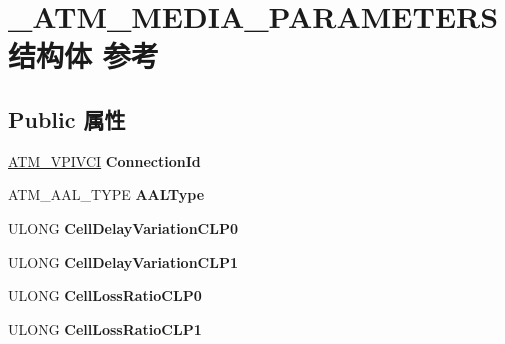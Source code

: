 \hypertarget{struct___a_t_m___m_e_d_i_a___p_a_r_a_m_e_t_e_r_s}{}\section{\+\_\+\+A\+T\+M\+\_\+\+M\+E\+D\+I\+A\+\_\+\+P\+A\+R\+A\+M\+E\+T\+E\+R\+S结构体 参考}
\label{struct___a_t_m___m_e_d_i_a___p_a_r_a_m_e_t_e_r_s}
\subsection*{Public 属性}
\begin{DoxyCompactItemize}
\item 
\mbox{\label{struct___a_t_m___m_e_d_i_a___p_a_r_a_m_e_t_e_r_s_a8a4501ec36deafa09b6568994094b5be}} 
\hyperlink{struct___a_t_m___v_p_i_v_c_i}{A\+T\+M\+\_\+\+V\+P\+I\+V\+CI} {\bfseries Connection\+Id}
\item 
\mbox{\label{struct___a_t_m___m_e_d_i_a___p_a_r_a_m_e_t_e_r_s_ae69f4a2d5c30b90a4d51c2f5bb8f179d}} 
A\+T\+M\+\_\+\+A\+A\+L\+\_\+\+T\+Y\+PE {\bfseries A\+A\+L\+Type}
\item 
\mbox{\label{struct___a_t_m___m_e_d_i_a___p_a_r_a_m_e_t_e_r_s_a86434a543ad3d5075bfd3881f74fbc31}} 
U\+L\+O\+NG {\bfseries Cell\+Delay\+Variation\+C\+L\+P0}
\item 
\mbox{\label{struct___a_t_m___m_e_d_i_a___p_a_r_a_m_e_t_e_r_s_ace0d8559f5f4746dab93a69c6fa6dd5e}} 
U\+L\+O\+NG {\bfseries Cell\+Delay\+Variation\+C\+L\+P1}
\item 
\mbox{\label{struct___a_t_m___m_e_d_i_a___p_a_r_a_m_e_t_e_r_s_aa57f67121821ebac96f279afd211a083}} 
U\+L\+O\+NG {\bfseries Cell\+Loss\+Ratio\+C\+L\+P0}
\item 
\mbox{\label{struct___a_t_m___m_e_d_i_a___p_a_r_a_m_e_t_e_r_s_aa490132d469e54d5cd81fdb1dedce108}} 
U\+L\+O\+NG {\bfseries Cell\+Loss\+Ratio\+C\+L\+P1}

\end{DoxyCompactItemize}

